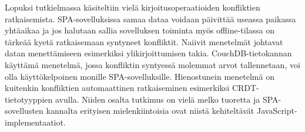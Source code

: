 \documentclass[finnish,twoside,censored,csm,sw-track-2018]{HYthesisML}
\begin{document}
Lopuksi tutkielmassa käsiteltiin vielä kirjoitusoperaatioiden konfliktien ratkaisemista. SPA-sovelluksissa samaa dataa voidaan päivittää useassa paikassa yhtäaikaa ja jos halutaan sallia sovelluksen toiminta myös offline-tilassa on tärkeää kyetä ratkaisemaan syntyneet konfliktit. Naiivit menetelmät johtavat datan menettämiseen esimerkiksi ylikirjoittumisen takia. CouchDB-tietokannan käyttämä menetelmä, jossa konfliktin syntyessä molemmat arvot tallennetaan, voi olla käyttökelpoinen monille SPA-sovelluksille. Hienostunein menetelmä on kuitenkin konfliktien automaattinen ratkaiseminen esimerkiksi CRDT-tietotyyppien avulla. Niiden osalta tutkimus on vielä melko tuoretta ja SPA-sovellusten kannalta erityisen mielenkiintoisia ovat niistä kehiteltävät JavaScript-implementaatiot.


\cleardoublepage                          %
{}  %
\printbibliography
\backmatter
\end{document}
